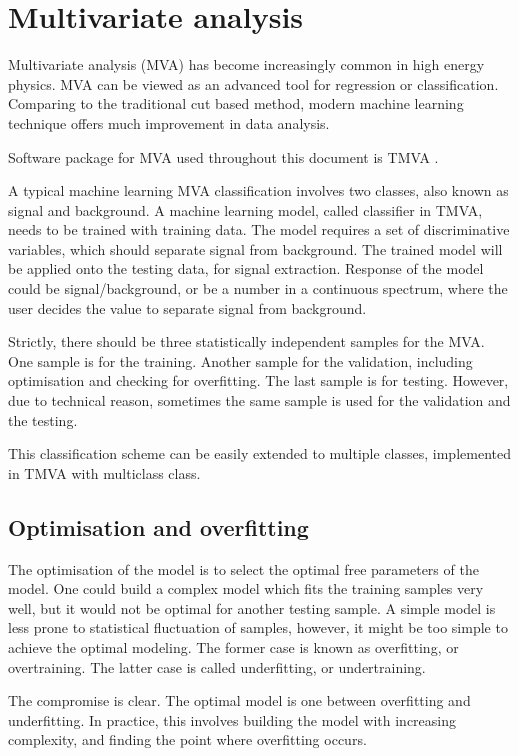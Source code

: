 \section{Multivariate analysis}
\label{sec:theoryMVA}

Multivariate analysis (MVA) has become increasingly common in high energy physics. MVA can be viewed as an advanced tool for regression or classification. Comparing to the traditional cut based method, modern machine learning technique offers much improvement in data analysis.

Software package for MVA used throughout this document is TMVA \cite{Hocker:2007ht}.

A typical machine learning MVA classification involves two classes, also known as signal and background. A machine learning model, called classifier in TMVA, needs to be trained with training data. The model requires a set of discriminative variables, which should separate signal from background. The trained model will be applied onto the testing data, for signal extraction. Response of the model could be signal/background, or be  a number in a continuous spectrum, where the user decides the value to separate signal from background.

Strictly, there should be three statistically independent samples for the MVA. One sample is for the training. Another sample for the validation, including optimisation and checking for overfitting. The last sample is for testing. However, due to technical reason, sometimes the same sample is used for the validation and the testing.

This classification scheme can be easily extended to multiple classes, implemented in TMVA with multiclass class.

\subsection{Optimisation and overfitting}

The optimisation of the model is to select the optimal free parameters of the model. One could build a complex model which fits the training samples very well, but it would not be optimal for another testing sample. A simple model is less prone to statistical fluctuation of samples, however, it might be too simple to achieve the optimal modeling. The former case is known as overfitting, or overtraining. The latter case is called underfitting, or undertraining.

The compromise is clear. The optimal model is one between overfitting and underfitting. In practice, this involves building the model with increasing complexity, and finding the point where overfitting occurs.

